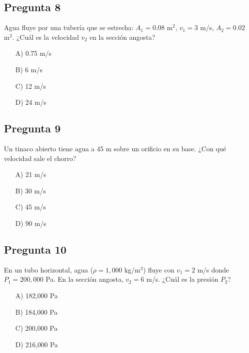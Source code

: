 \begin{preguntabox}
\subsection*{Pregunta 8}
Agua fluye por una tubería que se estrecha: $A_1 = 0.08$ m$^2$, $v_1 = 3$ m/s, $A_2 = 0.02$ m$^2$. ¿Cuál es la velocidad $v_2$ en la sección angosta?

\begin{enumerate}
    \item[A)] 0.75 m/s
    \item[B)] 6 m/s
    \item[C)] 12 m/s
    \item[D)] 24 m/s
\end{enumerate}
\end{preguntabox}
\newpage
\begin{preguntabox}
\subsection*{Pregunta 9}
Un tinaco abierto tiene agua a 45 m sobre un orificio en su base. ¿Con qué velocidad sale el chorro?

\begin{enumerate}
    \item[A)] 21 m/s
    \item[B)] 30 m/s
    \item[C)] 45 m/s
    \item[D)] 90 m/s
\end{enumerate}
\end{preguntabox}

\begin{preguntabox}
\subsection*{Pregunta 10}
En un tubo horizontal, agua ($\rho = 1{,}000$ kg/m$^3$) fluye con $v_1 = 2$ m/s donde $P_1 = 200{,}000$ Pa. En la sección angosta, $v_2 = 6$ m/s. ¿Cuál es la presión $P_2$?

\begin{enumerate}
    \item[A)] 182{,}000 Pa
    \item[B)] 184{,}000 Pa
    \item[C)] 200{,}000 Pa
    \item[D)] 216{,}000 Pa
\end{enumerate}
\end{preguntabox}

